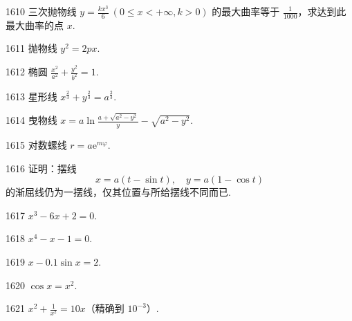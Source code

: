 \begin{prob}[M]{1610}
三次抛物线 $y = \frac{kx^3}{6} \ (0 \leqslant x < +\infty, k > 0)$ 的最大曲率等于 $\frac{1}{1000}$，求达到此最大曲率的点 $x$.
\end{prob}


\begin{prob}[S]{1611}
抛物线 $y^2 = 2px$.
\end{prob}

\begin{prob}[S]{1612}
椭圆 $\frac{x^2}{a^2} + \frac{y^2}{b^2} = 1$.
\end{prob}

\begin{prob}[S]{1613}
星形线 $x^{\frac{2}{3}} + y^{\frac{2}{3}} = a^{\frac{2}{3}}$.
\end{prob}

\begin{prob}[S]{1614}
曳物线 $x = a\ln\frac{a + \sqrt{a^2 - y^2}}{y} - \sqrt{a^2 - y^2}$.
\end{prob}

\begin{prob}[S]{1615}
对数螺线 $r = a\mathrm{e}^{m\varphi}$.
\end{prob}

\begin{prob}[M]{1616}
证明：摆线
\[
x = a(t - \sin t),\quad y = a(1 - \cos t)
\]
的渐屈线仍为一摆线，仅其位置与所给摆线不同而已.
\end{prob}



\begin{prob}[S]{1617}
$x^3 - 6x + 2 = 0$.
\end{prob}

\begin{prob}[S]{1618}
$x^4 - x - 1 = 0$.
\end{prob}

\begin{prob}[S]{1619}
$x - 0.1\sin x = 2$.
\end{prob}

\begin{prob}[S]{1620}
$\cos x = x^2$.
\end{prob}


\begin{prob}[S]{1621}
$x^2 + \frac{1}{x^2} = 10x$（精确到 $10^{-3}$）.
\end{prob}

